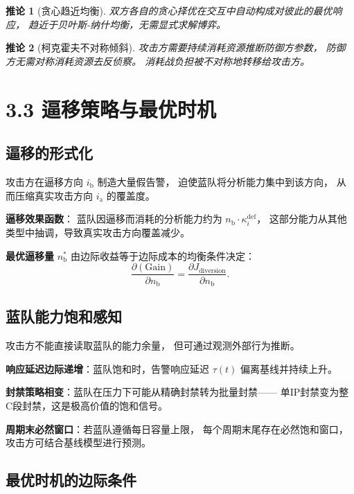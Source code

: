 \documentclass[11pt,a4paper]{article}
\newtheorem{corollary}{推论}[section]
\begin{document}
\begin{corollary}[贪心趋近均衡]
双方各自的贪心择优在交互中自动构成对彼此的最优响应，
趋近于贝叶斯-纳什均衡，无需显式求解博弈。
\end{corollary}

\begin{corollary}[柯克霍夫不对称倾斜]
攻击方需要持续消耗资源推断防御方参数，
防御方无需对称消耗资源去反侦察。
消耗战负担被不对称地转移给攻击方。
\end{corollary}

\section{3.3 逼移策略与最优时机}

\subsection{逼移的形式化}

攻击方在逼移方向 $i_{\text{b}}$ 制造大量假告警，
迫使蓝队将分析能力集中到该方向，
从而压缩真实攻击方向 $i_{\text{a}}$ 的覆盖度。

\textbf{逼移效果函数}：
蓝队因逼移而消耗的分析能力约为 $n_{\text{b}} \cdot \kappa_i^{\text{def}}$，
这部分能力从其他类型中抽调，导致真实攻击方向覆盖减少。

\textbf{最优逼移量} $n_{\text{b}}^*$ 由边际收益等于边际成本的均衡条件决定：
\[
\frac{\partial (\text{Gain})}{\partial n_{\text{b}}} = \frac{\partial J_{\text{diversion}}}{\partial n_{\text{b}}}.
\]

\subsection{蓝队能力饱和感知}

攻击方不能直接读取蓝队的能力余量，
但可通过观测外部行为推断。

\textbf{响应延迟边际递增}：蓝队饱和时，告警响应延迟 $\tau(t)$ 偏离基线并持续上升。

\textbf{封禁策略相变}：蓝队在压力下可能从精确封禁转为批量封禁——
单IP封禁变为整C段封禁，这是极高价值的饱和信号。

\textbf{周期末必然窗口}：若蓝队遵循每日容量上限，
每个周期末尾存在必然饱和窗口，
攻击方可结合基线模型进行预测。

\subsection{最优时机的边际条件}
\end{document}
